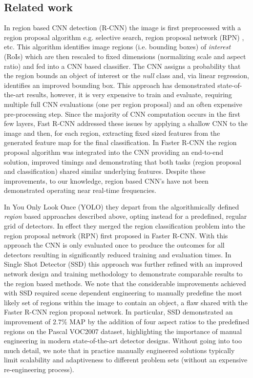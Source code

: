 \documentclass[10pt,twocolumn]{article}
\begin{document}
\subsection{Related work} \label{sec:related_work}

In region based CNN detection (R-CNN)\cite{rcnn} the image is first preprocessed with a region proposal algorithm e.g. selective search\cite{ssearch}, region proposal network (RPN) \cite{faster-rcnn}, etc. This algorithm identifies image regions (i.e. bounding boxes) of \textit{interest} (RoIs) which are then rescaled to fixed dimensions (normalizing scale and aspect ratio) and fed into a CNN based classifier. The CNN assigns a probability that the region bounds an object of interest or the \textit{null} class and, via linear regression, identifies an improved bounding box. This approach has demonstrated state-of-the-art results, however, it is very expensive to train and evaluate, requiring multiple full CNN evaluations (one per region proposal) and an often expensive pre-processing step. Since the majority of CNN computation occurs in the first few layers, Fast R-CNN\cite{fast-rcnn} addressed these issues by applying a shallow CNN to the image and then, for each region, extracting fixed sized features from the generated feature map for the final classification. In Faster R-CNN\cite{faster-rcnn} the region proposal algorithm was integrated into the CNN providing an end-to-end solution, improved timings and demonstrating that both tasks (region proposal and classification) shared similar underlying features. Despite these improvements, to our knowledge, region based CNN's have not been demonstrated operating near real-time frequencies.

In You Only Look Once (YOLO)\cite{yolo} they depart from the algorithmically defined \textit{region} based approaches described above, opting instead for a predefined, regular grid of detectors. In effect they merged the region classification problem into the region proposal network (RPN) first proposed in Faster R-CNN. With this approach the CNN is only evaluated once to produce the outcomes for all detectors resulting in significantly reduced training and evaluation times. In Single Shot Detector (SSD)\cite{ssd} this approach was further refined with an improved network design and training methodology to demonstrate comparable results to the region based methods. We note that the considerable improvements achieved with SSD required scene dependent engineering to manually predefine the most likely set of regions within the image to contain an object, a flaw shared with the Faster R-CNN region proposal network. In particular, SSD demonstrated an improvement of $2.7\%$ MAP\cite{ssd} by the addition of four aspect ratios to the predefined regions on the Pascal VOC2007\cite{pascal-voc} dataset, highlighting the importance of manual engineering in modern state-of-the-art detector designs. Without going into too much detail, we note that in practice manually engineered solutions typically limit scalability and adaptiveness to different problem sets (without an expensive re-engineering process).
\end{document}
